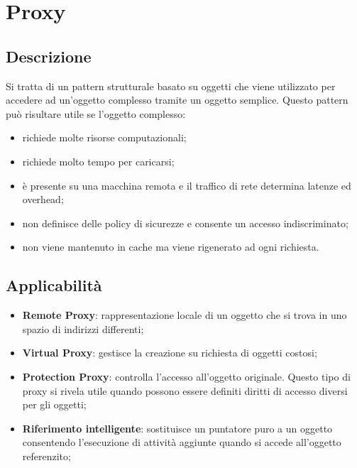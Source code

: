 \section{Proxy}
\subsection{Descrizione}
Si tratta di un pattern strutturale basato su oggetti che viene utilizzato per accedere ad un’oggetto complesso tramite un oggetto semplice.
Questo pattern può risultare utile se l’oggetto complesso:
\begin{itemize}
\item richiede molte risorse computazionali;
\item richiede molto tempo per caricarsi;
\item è presente su una macchina remota e il traffico di rete determina latenze ed overhead;
\item non definisce delle policy di sicurezze e consente un accesso indiscriminato;
\item non viene mantenuto in cache ma viene rigenerato ad ogni richiesta.
\end{itemize}

\subsection{Applicabilità}
\begin{itemize}
	\item \textbf{Remote Proxy}: rappresentazione locale di un oggetto che si trova in uno spazio di indirizzi differenti;
	\item \textbf{Virtual Proxy}: gestisce la creazione su richiesta di oggetti costosi;
	\item \textbf{Protection Proxy}: controlla l'accesso all'oggetto originale. Questo tipo di proxy si rivela utile quando possono essere definiti diritti di accesso diversi per gli oggetti;
	\item \textbf{Riferimento intelligente}: sostituisce un puntatore puro a un oggetto consentendo l'esecuzione di attività aggiunte quando si accede all'oggetto referenzito;
\end{itemize}